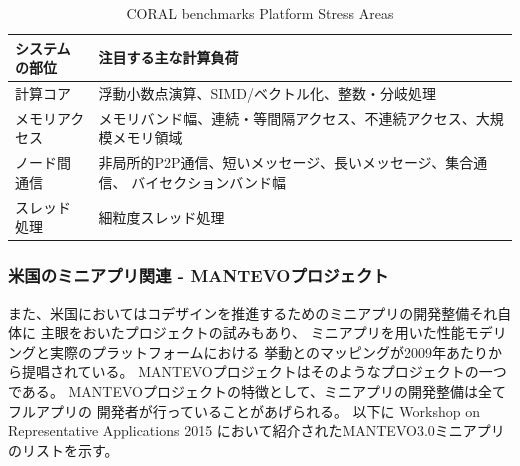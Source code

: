 \begin{table}[H]
\caption{CORAL benchmarks Platform Stress Areas}
\label{tab:CORAL-benchmarks-stress}
{
\begin{tabular}{p{30mm}|p{120mm}} \hline
システムの部位	&	注目する主な計算負荷 \\ \hline \hline

計算コア
	& 浮動小数点演算、SIMD/ベクトル化、整数・分岐処理 \\
	\hline
メモリアクセス
	& メモリバンド幅、連続・等間隔アクセス、不連続アクセス、大規模メモリ領域\\
	\hline
ノード間通信
	& 非局所的P2P通信、短いメッセージ、長いメッセージ、集合通信、
		バイセクションバンド幅　\\
	\hline
スレッド処理
	& 細粒度スレッド処理　\\
	\hline
\end{tabular}
}
\end{table}


\subsubsection{米国のミニアプリ関連 - MANTEVOプロジェクト}
また、米国においてはコデザインを推進するためのミニアプリの開発整備それ自体に
主眼をおいたプロジェクトの試みもあり、
ミニアプリを用いた性能モデリングと実際のプラットフォームにおける
挙動とのマッピングが2009年あたりから提唱されている。
MANTEVOプロジェクトはそのようなプロジェクトの一つである\cite{MANTEVO-project}。
MANTEVOプロジェクトの特徴として、ミニアプリの開発整備は全てフルアプリの
開発者が行っていることがあげられる。
以下に Workshop on Representative Applications 2015 \cite{MANTEVO-Reps}
において紹介されたMANTEVO3.0ミニアプリのリストを示す。


